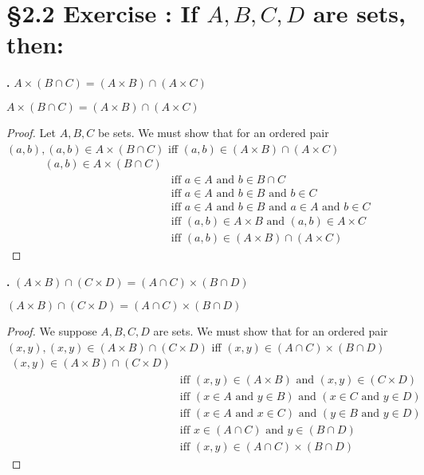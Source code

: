 \documentclass[a4paper,11pt]{article}
\begin{document}
\section*{\S 2.2 Exercise : If \(A, B, C, D\) are sets, then: }
\textbf{.}
\(A \times {(B \cap C)}={(A \times B)}\cap{(A \times C)}\)
\begin{theorem5}
\(A \times {(B \cap C)}={(A \times B)}\cap{(A \times C)}\)
\begin{proof}
Let \(A, B, C\) be sets. We must show that for an ordered pair\\
\({(a,b)},{(a,b)} \in A \times {(B \cap C)}\) iff \({(a,b)} \in {(A \times B) \cap {(A \times 
C)}}\)
\begin{align*}
  {(a,b)} \in A \times {(B \cap C)}&\\
  &\text{iff } a \in A \text{ and } b \in B \cap C\\
  &\text{iff } a \in A \text{ and } b \in B \text{ and } b \in C\\
  &\text{iff } a \in A \text{ and } b \in B \text{ and } a \in A \text{ and } b \in C\\
  &\text{iff } {(a,b)} \in A \times B \text{ and } {(a,b)} \in A \times C\\
  &\text{iff } {(a,b)} \in {(A \times B)} \cap {(A \times C)}
\end{align*}
\end{proof}
\end{theorem5}

\setcounter{SubsectionCounter}{3}
\noindent\textbf{.}
\({(A \times B)} \cap {(C \times D)} = {(A \cap C)} \times {(B \cap D)}\)
\begin{theorem5}
\({(A \times B)} \cap {(C \times D)} = {(A \cap C)} \times {(B \cap D)}\)
\begin{proof}
We suppose \(A, B, C, D\) are sets. We must show that for an ordered pair\\
\({(x,y)},{(x,y)} \in {(A \times B)} \cap {(C \times D)}\) iff \({(x,y) \in {(A \cap C)} \times {(B \cap D)}}\)
\begin{align*}
  {(x,y)} \in {(A \times B)} \cap {(C \times D)}&\\
  &\text{iff } {(x,y)} \in {(A \times B)} \text{ and } {(x,y)} \in {(C \times D)}\\
  &\text{iff } {(x \in A \text{ and } y \in B)} \text{ and } {(x \in C \text{ and } y \in D)}\\
  &\text{iff } {(x \in A \text{ and } x \in C)} \text{ and } {(y \in B \text{ and } y \in D)}\\
  &\text{iff } {x \in {(A \cap C)} \text{ and } y \in {(B \cap D)}}\\
  &\text{iff } {(x,y)} \in {(A \cap C)} \times {(B \cap D)}
\end{align*}
\end{proof}
\end{theorem5}
\end{document}
